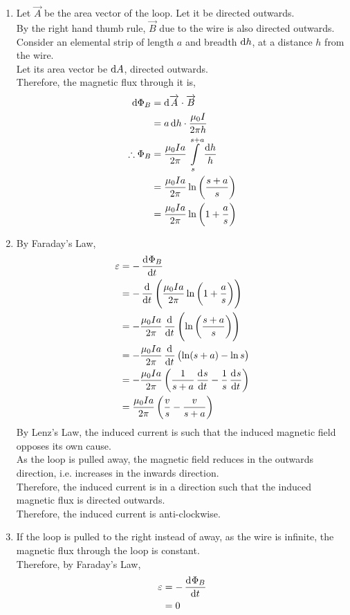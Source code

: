 \documentclass[fleqn, a4paper, 11pt, oneside]{amsart}
\theoremstyle{definition}
\theoremstyle{theorem}
\begin{document}
\begin{solution}
	\begin{enumerate}
		\item
			Let $\overrightarrow{A}$ be the area vector of the loop.
			Let it be directed outwards.\\
			By the right hand thumb rule, $\overrightarrow{B}$ due to the wire is also directed outwards.\\
			Consider an elemental strip of length $a$ and breadth $\dif h$, at a distance $h$ from the wire.\\
			Let its area vector be $\dif A$, directed outwards.\\
			Therefore, the magnetic flux through it is,
			\begin{align*}
				\dif \Phi_B &= \dif \overrightarrow{A} \cdot \overrightarrow{B}\\
				&= a \dif h \cdot \frac{\mu_0 I}{2 \pi h}\\
				\therefore \Phi_B &= \frac{\mu_0 I a}{2 \pi} \int\limits_{s}^{s + a} \frac{\dif h}{h}\\
				&= \frac{\mu_0 I a}{2 \pi} \ln\left( \frac{s + a}{s} \right)\\
				&= \frac{\mu_0 I a}{2 \pi} \ln\left( 1 + \frac{a}{s} \right)
			\end{align*}
		\item
			By Faraday's Law,
			\begin{align*}
				\varepsilon &= -\dod{\Phi_B}{t}\\
				&= -\dod{}{t}\left( \frac{\mu_0 I a}{2 \pi} \ln \left( 1 + \frac{a}{s} \right) \right)\\
				&= -\frac{\mu_0 I a}{2 \pi} \dod{}{t}\left( \ln \left( \frac{s + a}{s} \right) \right)\\
				&= -\frac{\mu_0 I a}{2 \pi} \dod{}{t}\left( \ln(s + a) - \ln s \right)\\
				&= -\frac{\mu_0 I a}{2 \pi} \left( \frac{1}{s + a} \dod{s}{t} - \frac{1}{s} \dod{s}{t} \right)\\
				&= \frac{\mu_0 I a}{2 \pi} \left( \frac{v}{s} - \frac{v}{s + a} \right)
			\end{align*}
			By Lenz's Law, the induced current is such that the induced magnetic field opposes its own cause.\\
			As the loop is pulled away, the magnetic field reduces in the outwards direction, i.e. increases in the inwards direction.\\
			Therefore, the induced current is in a direction such that the induced magnetic flux is directed outwards.\\
			Therefore, the induced current is anti-clockwise.
		\item
			If the loop is pulled to the right instead of away, as the wire is infinite, the magnetic flux through the loop is constant.\\
			Therefore, by Faraday's Law,
			\begin{align*}
				\varepsilon &= -\dod{\Phi_B}{t}\\
				&= 0
			\end{align*}
	\end{enumerate}
\end{solution}
\end{document}
